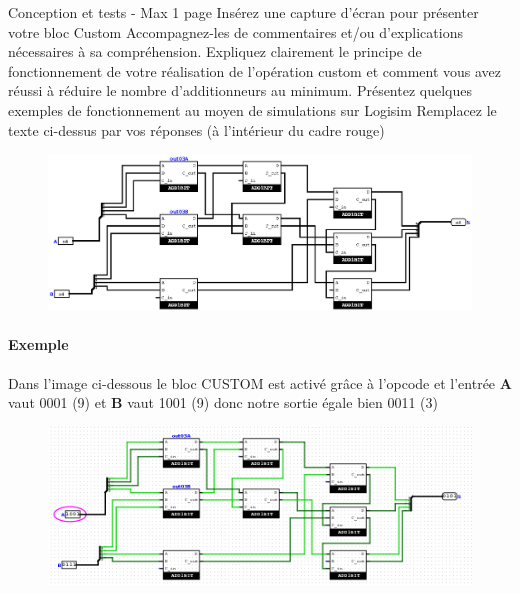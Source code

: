\documentclass[a4paper]{article}
\begin{document}
\begin{tcolorbox}[colframe=Monokaimagenta,colback=white]
Conception et tests -  Max 1 page 
Insérez une capture d’écran pour présenter votre bloc Custom
Accompagnez-les de commentaires et/ou d’explications nécessaires à sa compréhension.
Expliquez clairement le principe de fonctionnement de votre réalisation de l’opération custom et comment vous avez réussi à réduire le nombre d’additionneurs au minimum.
Présentez quelques exemples de fonctionnement au moyen de simulations sur Logisim
Remplacez le texte ci-dessus par vos réponses (à l’intérieur du cadre rouge)

\begin{figure}[H]
    \centering
    \includegraphics[width=\textwidth]{src/CUSTOM.png}
    \label{fig:CUSTOM}
\end{figure}

\paragraph{Exemple}
Dans l'image ci-dessous le bloc CUSTOM est activé grâce à l'opcode et l'entrée \textbf{A} vaut 0001 (9) et \textbf{B} vaut 1001 (9) donc notre sortie égale bien 0011 (3)
\begin{figure}[H]
    \centering
    \includegraphics[width=\textwidth]{src/COMP_TEST.png}
    \label{fig:CUSTOM}
\end{figure}


\end{tcolorbox}
\end{document}
